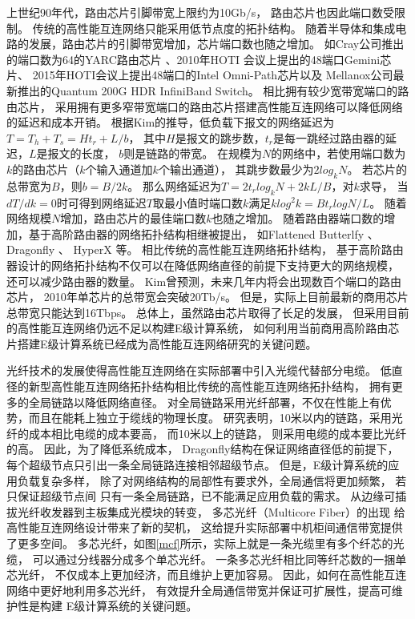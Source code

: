 上世纪90年代，路由芯片引脚带宽上限约为10Gb/s，
路由芯片也因此端口数受限制。
传统的高性能互连网络只能采用低节点度的拓扑结构。
随着半导体和集成电路的发展，路由芯片的引脚带宽增加，芯片端口数也随之增加。
如Cray公司推出的端口数为64的YARC路由芯片
、2010年HOTI
会议上提出的48端口Gemini芯片、
2015年HOTI会议上提出48端口的Intel Omni-Path芯片以及
Mellanox公司最新推出的Quantum 200G HDR InfiniBand Switch。
相比拥有较少宽带宽端口的路由芯片，
采用拥有更多窄带宽端口的路由芯片搭建高性能互连网络可以降低网络的延迟和成本开销。
根据Kim的推导，低负载下报文的网络延迟为$T=T_h+T_s=Ht_r+L/b$，
其中$H$是报文的跳步数，$t_r$是每一跳经过路由器的延迟，$L$是报文的长度，
$b$则是链路的带宽。
在规模为$N$的网络中，若使用端口数为$k$的路由芯片（$k$个输入通道加$k$个输出通道），
其跳步数最少为$2log_{k}N$。
若芯片的总带宽为$B$，则$b=B/2k$。
那么网络延迟为$T=2t_{r}log_{k}N+2kL/B$，对$k$求导，
当$dT/dk=0$时可得到网络延迟$T$取最小值时端口数$k$满足$klog^2k=Bt_rlogN/L$。
随着网络规模$N$增加，路由芯片的最佳端口数$k$也随之增加。
随着路由器端口数的增加，基于高阶路由器的网络拓扑结构相继被提出，
如Flattened Butterlfy 、Dragonfly 、
HyperX 等。
相比传统的高性能互连网络拓扑结构，
基于高阶路由器设计的网络拓扑结构不仅可以在降低网络直径的前提下支持更大的网络规模，
还可以减少路由器的数量。
Kim曾预测，未来几年内将会出现数百个端口的路由芯片，
2010年单芯片的总带宽会突破20Tb/s。
但是，实际上目前最新的商用芯片总带宽只能达到16Tbps。
总体上，虽然路由芯片取得了长足的发展，
但采用目前的高性能互连网络仍远不足以构建E级计算系统，
如何利用当前商用高阶路由芯片搭建E级计算系统已经成为高性能互连网络研究的关键问题。

光纤技术的发展使得高性能互连网络在实际部署中引入光缆代替部分电缆。
低直径的新型高性能互连网络拓扑结构相比传统的高性能互连网络拓扑结构，
拥有更多的全局链路以降低网络直径。
对全局链路采用光纤部署，不仅在性能上有优势，而且在能耗上独立于缆线的物理长度。
研究表明，10米以内的链路，采用光纤的成本相比电缆的成本要高，
而10米以上的链路，
则采用电缆的成本要比光纤的高。
因此，为了降低系统成本，
Dragonfly结构在保证网络直径低的前提下，
每个超级节点只引出一条全局链路连接相邻超级节点。
但是，E级计算系统的应用负载复杂多样，
除了对网络结构的局部性有要求外，全局通信将更加频繁，
若只保证超级节点间
只有一条全局链路，已不能满足应用负载的需求。
从边缘可插拔光纤收发器到主板集成光模块的转变，
多芯光纤（Multicore Fiber）的出现
给高性能互连网络设计带来了新的契机，
这给提升实际部署中机柜间通信带宽提供了更多空间。
多芯光纤，如图\ref{mcf}所示，实际上就是一条光缆里有多个纤芯的光缆，
可以通过分线器分成多个单芯光纤。
一条多芯光纤相比同等纤芯数的一捆单芯光纤，
不仅成本上更加经济，而且维护上更加容易。
因此，如何在高性能互连网络中更好地利用多芯光纤，
有效提升全局通信带宽并保证可扩展性，提高可维护性是构建
E级计算系统的关键问题。

